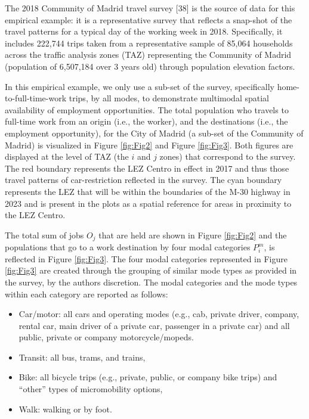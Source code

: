 \documentclass[10pt,letterpaper]{article}
\providecommand{\tightlist}{%
  \setlength{\itemsep}{0pt}\setlength{\parskip}{0pt}}
\begin{document}
The 2018 Community of Madrid travel survey {[}38{]} is the source of
data for this empirical example: it is a representative survey that
reflects a snap-shot of the travel patterns for a typical day of the
working week in 2018. Specifically, it includes 222,744 trips taken from
a representative sample of 85,064 households across the traffic analysis
zones (TAZ) representing the Community of Madrid (population of
6,507,184 over 3 years old) through population elevation factors.

In this empirical example, we only use a sub-set of the survey,
specifically home-to-full-time-work trips, by all modes, to demonstrate
multimodal spatial availability of employment opportunities. The total
population who travels to full-time work from an origin (i.e., the
worker), and the destinations (i.e., the employment opportunity), for
the City of Madrid (a sub-set of the Community of Madrid) is visualized
in Figure \ref{fig:Fig2} and Figure \ref{fig:Fig3}. Both figures are
displayed at the level of TAZ (the \(i\) and \(j\) zones) that
correspond to the survey. The red boundary represents the LEZ Centro in
effect in 2017 and thus those travel patterns of car-restriction
reflected in the survey. The cyan boundary represents the LEZ that will
be within the boundaries of the M-30 highway in 2023 and is present in
the plots as a spatial reference for areas in proximity to the LEZ
Centro.

The total sum of jobs \(O_j\) that are held are shown in Figure
\ref{fig:Fig2} and the populations that go to a work destination by four
modal categories \(P^m_i\), is reflected in Figure \ref{fig:Fig3}. The
four modal categories represented in Figure \ref{fig:Fig3} are created
through the grouping of similar mode types as provided in the survey, by
the authors discretion. The modal categories and the mode types within
each category are reported as follows:

\begin{itemize}
\tightlist
\item
  Car/motor: all cars and operating modes (e.g., cab, private driver,
  company, rental car, main driver of a private car, passenger in a
  private car) and all public, private or company motorcycle/mopeds.
\item
  Transit: all bus, trams, and trains,
\item
  Bike: all bicycle trips (e.g., private, public, or company bike trips)
  and ``other'' types of micromobility options,
\item
  Walk: walking or by foot.
\end{itemize}
\end{document}
